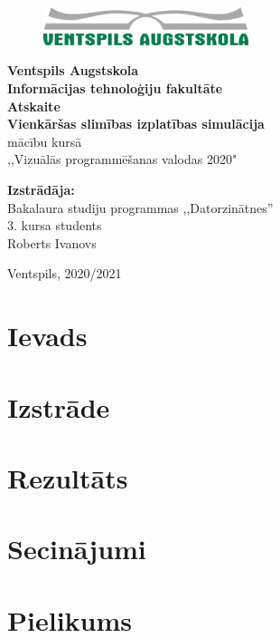 \documentclass[12pt,a4paper,oneside]{article}
\begin{document}
\begin{titlepage}
	\begin{center}
		\begin{figure}[ht]
			\centering
			\includegraphics[width=60mm]{images/vea_logo.png}
		\end{figure}
		\large
		\textbf{Ventspils Augstskola \\Informācijas tehnoloģiju fakultāte}
		\vspace*{4cm}
		\\
		\textbf{Atskaite} \\
		\LARGE
		\textbf{Vienkāršas slimības izplatības simulācija}
		\vspace{0.5cm}
		\large
		\\
		mācību kursā \\,,Vizuālās programmēšanas valodas 2020"
	\end{center}

	\vspace{2cm}

	\begin{flushright}
		\normalsize
		\textbf{Izstrādāja:}\\
		Bakalaura studiju programmas ,,Datorzinātnes”\\
		3. kursa students\\
		Roberts Ivanovs \\
	\end{flushright}

	\vfill

	\begin{center}
		\Large
		Ventspils, 2020/2021
	\end{center}

\end{titlepage}

\clearpage
\tableofcontents
\clearpage

\newpage
\section{Ievads}


\newpage
\section{Izstrāde}


\newpage
\section{Rezultāts}


\newpage
\section{Secinājumi}


\newpage
\section{Pielikums}


\newpage
\printbibliography
\end{document}
